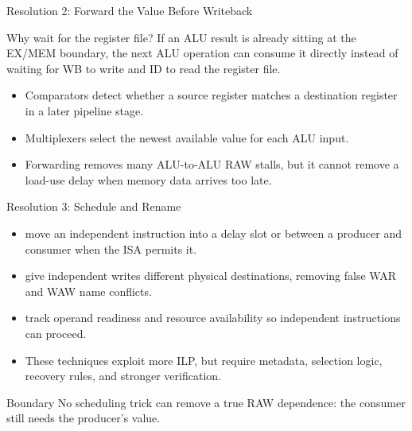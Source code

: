 \documentclass[aspectratio=169]{beamer}
\begin{document}
\begin{frame}{Resolution 2: Forward the Value Before Writeback}
  \begin{exampleblock}{Why wait for the register file?}
    If an ALU result is already sitting at the EX/MEM boundary, the next ALU
    operation can consume it directly instead of waiting for WB to write and
    ID to read the register file.
  \end{exampleblock}
  \begin{itemize}
    \item Comparators detect whether a source register matches a destination
      register in a later pipeline stage.
    \item Multiplexers select the newest available value for each ALU input.
    \item Forwarding removes many ALU-to-ALU RAW stalls, but it cannot remove
      a load-use delay when memory data arrives too late.
  \end{itemize}
\end{frame}

\begin{frame}{Resolution 3: Schedule and Rename}
  \begin{itemize}
    \item {} move an independent instruction into a
      delay slot or between a producer and consumer when the ISA permits it.
    \item {} give independent writes different physical
      destinations, removing false WAR and WAW name conflicts.
    \item {} track operand readiness
      and resource availability so independent instructions can proceed.
    \item These techniques exploit more ILP, but require metadata, selection
      logic, recovery rules, and stronger verification.
  \end{itemize}
  \begin{alertblock}{Boundary}
    No scheduling trick can remove a true RAW dependence: the consumer still
    needs the producer's value.
  \end{alertblock}
\end{frame}
\end{document}
